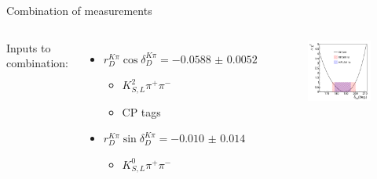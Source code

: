 \documentclass{beamer}
\begin{document}
\begin{frame}{Combination of measurements}
  \begin{columns}
    Inputs to combination:
    \vspace{0.5cm}
    \begin{itemize}
      \setlength\itemsep{2.0em}
      \item{$r_D^{K\pi}\cos\delta_D^{K\pi} = \SI{-0.0588(52)}{}$}
      \begin{itemize}
        \item{$K_{S, L}^2\pi^+\pi^-$}
        \item{CP tags}
      \end{itemize}
      \item{$r_D^{K\pi}\sin\delta_D^{K\pi} = \SI{-0.010(14)}{}$}
      \begin{itemize}
        \item{$K_{S, L}^0\pi^+\pi^-$}
      \end{itemize}
    \end{itemize}
    \begin{figure}
      \centering
      \includegraphics[width=\textwidth]{delta_kpi_combination.pdf}
    \end{figure}
  \end{columns}
\end{frame}
\end{document}
